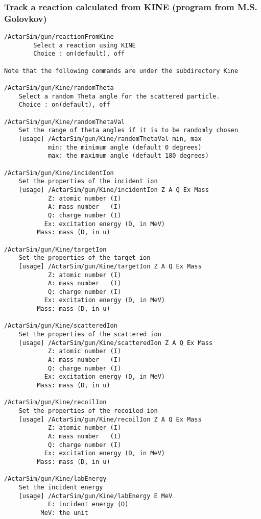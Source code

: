 \subsubsection{Track a reaction calculated from KINE (program from M.S. Golovkov)}
\begin{verbatim}
/ActarSim/gun/reactionFromKine
        Select a reaction using KINE
        Choice : on(default), off

Note that the following commands are under the subdirectory Kine

/ActarSim/gun/Kine/randomTheta
    Select a random Theta angle for the scattered particle.
    Choice : on(default), off

/ActarSim/gun/Kine/randomThetaVal
    Set the range of theta angles if it is to be randomly chosen
    [usage] /ActarSim/gun/Kine/randomThetaVal min, max
            min: the minimum angle (default 0 degrees)
            max: the maximum angle (default 180 degrees)

/ActarSim/gun/Kine/incidentIon
    Set the properties of the incident ion
    [usage] /ActarSim/gun/Kine/incidentIon Z A Q Ex Mass
            Z: atomic number (I)
            A: mass number   (I)
            Q: charge number (I)
           Ex: excitation energy (D, in MeV)
         Mass: mass (D, in u)  

/ActarSim/gun/Kine/targetIon
    Set the properties of the target ion
    [usage] /ActarSim/gun/Kine/targetIon Z A Q Ex Mass
            Z: atomic number (I)
            A: mass number   (I)
            Q: charge number (I)
           Ex: excitation energy (D, in MeV)
         Mass: mass (D, in u)  

/ActarSim/gun/Kine/scatteredIon
    Set the properties of the scattered ion
    [usage] /ActarSim/gun/Kine/scatteredIon Z A Q Ex Mass
            Z: atomic number (I)
            A: mass number   (I)
            Q: charge number (I)
           Ex: excitation energy (D, in MeV)
         Mass: mass (D, in u)  

/ActarSim/gun/Kine/recoilIon
    Set the properties of the recoiled ion
    [usage] /ActarSim/gun/Kine/recoilIon Z A Q Ex Mass
            Z: atomic number (I)
            A: mass number   (I)
            Q: charge number (I)
           Ex: excitation energy (D, in MeV)
         Mass: mass (D, in u)  

/ActarSim/gun/Kine/labEnergy
    Set the incident energy
    [usage] /ActarSim/gun/Kine/labEnergy E MeV
            E: incident energy (D)
          MeV: the unit


\end{verbatim}
